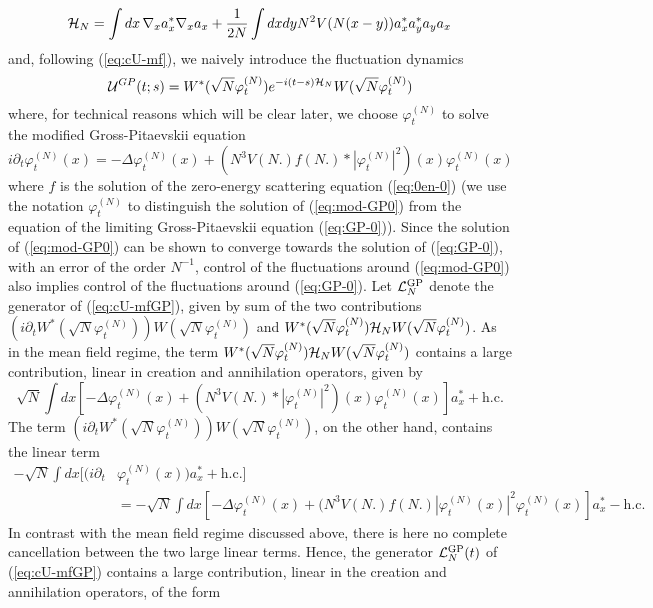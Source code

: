 \documentclass[11pt,a4paper,DIV11]{scrartcl}	%
\newcommand{\cU}{{\cal U}}
\newcommand{\cH}{{\cal H}}
\newcommand{\cL}{{\cal L}}
\begin{document}
\begin{equation}\label{eq:cHN} \cH_N = \int dx \, \nabla_x a_x^* \nabla_x a_x + \frac{1}{2N} \int dx dy N^2 V(N (x-y)) a_x^* a_y^* a_y a_x \end{equation}
and, following (\ref{eq:cU-mf}), we naively introduce the fluctuation dynamics
\begin{equation}\label{eq:cU-mfGP} 
\cU^{GP} (t;s) = W^* (\sqrt{N} \varphi^{(N)}_t) e^{-i (t-s) \cH_N} W(\sqrt{N} \varphi^{(N)}_t) \end{equation}
where, for technical reasons which will be clear later, we choose $\varphi^{(N)}_t$ to solve the modified Gross-Pitaevskii equation 
\begin{equation}\label{eq:mod-GP0} i\partial_t \varphi^{(N)}_t (x) = -\Delta \varphi^{(N)}_t (x) + (N^3 V(N.) f(N.) * |\varphi^{(N)}_t|^2) (x) \varphi^{(N)}_t (x) \end{equation}
where $f$ is the solution of the zero-energy scattering equation (\ref{eq:0en-0}) (we use the notation $\varphi_t^{(N)}$ to distinguish the solution of (\ref{eq:mod-GP0}) from the equation of the limiting Gross-Pitaevskii equation (\ref{eq:GP-0})). Since the solution of (\ref{eq:mod-GP0}) can be shown to converge towards the solution of (\ref{eq:GP-0}), with an error of the order $N^{-1}$, control of the fluctuations around (\ref{eq:mod-GP0}) also implies control of the fluctuations around (\ref{eq:GP-0}). Let $\cL_N^{\text{GP}}$ denote the generator of (\ref{eq:cU-mfGP}), given by sum of the two contributions $(i\partial_t W^* (\sqrt{N} \varphi^{(N)}_t)) W (\sqrt{N} \varphi^{(N)}_t)$ and $W^* (\sqrt{N} \varphi^{(N)}_t) \cH_N W (\sqrt{N} \varphi^{(N)}_t)$. As in the mean field regime, the term $W^*(\sqrt{N} \varphi^{(N)}_t) \cH_N W(\sqrt{N} \varphi^{(N)}_t)$ contains a large contribution, linear in creation and annihilation operators, given by
\[ \sqrt{N} \int dx \left[ -\Delta \varphi^{(N)}_t (x) + (N^3 V (N.) * |\varphi^{(N)}_t|^2) (x) \varphi^{(N)}_t (x) \right] a_x^* + \text{h.c.} \] 
The term $(i\partial_t W^* (\sqrt{N} \varphi^{(N)}_t)) W (\sqrt{N} \varphi^{(N)}_t)$, on the other hand, contains the linear term
\[ \begin{split} 
- \sqrt{N} \int dx \big[ (i\partial_t &\varphi^{(N)}_t (x)) a_x^* + \text{h.c.}\big]  \\
&=- \sqrt{N} \int dx \left[ -\Delta \varphi^{(N)}_t (x) + (N^3 V(N.) f(N.) |\varphi^{(N)}_t (x)|^2 \varphi^{(N)}_t (x) \right] a_x^* - \text{h.c.}
\end{split}\]
In contrast with the mean field regime discussed above, there is here no complete cancellation between the two large linear terms. Hence, the generator $\cL^{\text{GP}}_N (t)$ of (\ref{eq:cU-mfGP}) contains a large contribution, linear in the creation and annihilation operators, of the form
\end{document}
